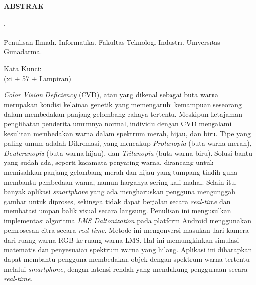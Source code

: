 
\thispagestyle{chapterpage}

{\singlespacing

\begin{center}
  {\bfseries ABSTRAK}
\end{center}

\noindent
\NamaMahasiswa, \NPM \\
\MakeUppercase{\JudulPISatu}\\
Penulisan Ilmiah. Informatika. Fakultas Teknologi Industri. Universitas Gunadarma. \Tahun

\noindent
Kata Kunci: \KataKunci\\
(xi + 57 + Lampiran)

\medskip
\noindent
\textit{Color Vision Deficiency} (CVD), atau yang dikenal sebagai buta warna merupakan kondisi kelainan genetik yang memengaruhi kemampuan seseorang dalam membedakan panjang gelombang cahaya tertentu.
Meskipun ketajaman penglihatan penderita umumnya normal, individu dengan CVD mengalami kesulitan membedakan warna dalam spektrum merah, hijau, dan biru.
Tipe yang paling umum adalah Dikromasi, yang mencakup \textit{Protanopia} (buta warna merah), \textit{Deuteranopia} (buta warna hijau), dan \textit{Tritanopia} (buta warna biru).
Solusi bantu yang sudah ada, seperti kacamata penyaring warna, dirancang untuk memisahkan panjang gelombang merah dan hijau yang tumpang tindih guna membantu pembedaan warna, namun harganya sering kali mahal.
Selain itu, banyak aplikasi \textit{smartphone} yang ada mengharuskan pengguna mengunggah gambar untuk diproses, sehingga tidak dapat berjalan secara \textit{real-time} dan membatasi umpan balik visual secara langsung.
Penulisan ini mengusulkan implementasi algoritma \textit{LMS Daltonization} pada platform Android menggunakan pemrosesan citra secara \textit{real-time}.
Metode ini mengonversi masukan dari kamera dari ruang warna RGB ke ruang warna LMS.
Hal ini memungkinkan simulasi matematis dan penyesuaian spektrum warna yang hilang.
Aplikasi ini diharapkan dapat membantu pengguna membedakan objek dengan spektrum warna tertentu melalui \textit{smartphone}, dengan latensi rendah yang mendukung penggunaan secara \textit{real-time}.

}
